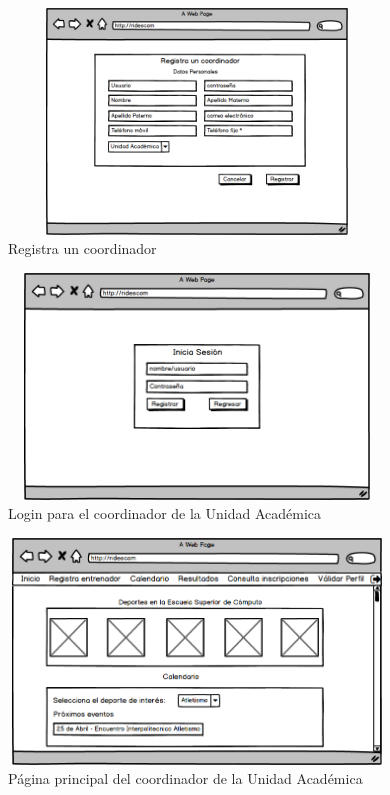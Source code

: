 		\begin{figure}[hbt!]
			\centering
			\includegraphics[width=10cm, height=6cm]{Imagenes/Disenos/p7Registrocoordinador.png}
			\caption{Registra un coordinador}
			\label{Registrocoordinador}
		\end{figure}
	
		\begin{figure}[hbt!]
			\centering
			\includegraphics[width=10cm, height=6cm]{Imagenes/Disenos/p8LogincoordUA.png}
			\caption{Login para el coordinador de la Unidad Académica}
			\label{LogincoordUA}
		\end{figure}
	
		\begin{figure}[hbt!]
			\centering
			\includegraphics[width=10cm, height=6cm]{Imagenes/Disenos/p9InicioCoordUA.png}
			\caption{Página principal del coordinador de la Unidad Académica}
			\label{IniciogeneralcoordUA}
		\end{figure}
			\pagebreak
	

